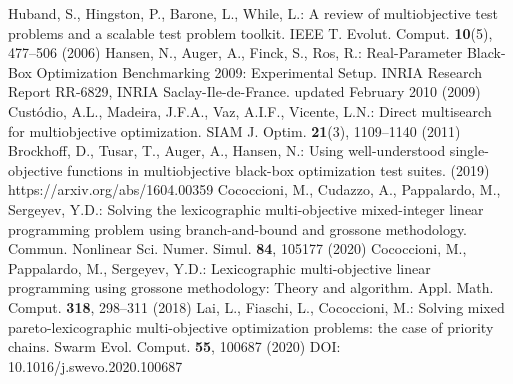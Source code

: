 \documentclass[smallextended]{svjour3}       %
\begin{document}
\begin{thebibliography}{}
 Huband, S., Hingston, P., Barone, L., While, L.: A review of multiobjective test problems and a scalable test problem toolkit. IEEE T. Evolut. Comput. \textbf{10}(5), 477--506 (2006)
 Hansen, N., Auger, A., Finck, S., Ros, R.: Real-Parameter Black-Box Optimization Benchmarking 2009: Experimental Setup. INRIA Research Report RR-6829, INRIA Saclay-Ile-de-France. updated February 2010 (2009)
 Cust\'odio, A.L., Madeira, J.F.A., Vaz, A.I.F., Vicente, L.N.: Direct multisearch for multiobjective optimization. SIAM J. Optim. \textbf{21}(3), 1109--1140 (2011)
 Brockhoff, D., Tusar, T., Auger, A., Hansen, N.: Using well-understood single-objective functions in multiobjective black-box optimization test suites. (2019) https://arxiv.org/abs/1604.00359 
 Cococcioni, M., Cudazzo, A., Pappalardo, M., Sergeyev, Y.D.: Solving the lexicographic multi-objective mixed-integer linear programming problem using branch-and-bound and grossone methodology. Commun. Nonlinear Sci. Numer. Simul. \textbf{84}, 105177 (2020)
 Cococcioni, M., Pappalardo, M., Sergeyev, Y.D.: Lexicographic multi-objective linear programming using grossone methodology: Theory and algorithm. Appl. Math. Comput. \textbf{318}, 298--311 (2018)
 Lai, L., Fiaschi, L., Cococcioni, M.: Solving mixed pareto-lexicographic multi-objective optimization problems: the case of priority chains. Swarm Evol. Comput. \textbf{55}, 100687 (2020) DOI: 10.1016/j.swevo.2020.100687


\end{thebibliography}
\end{document}

